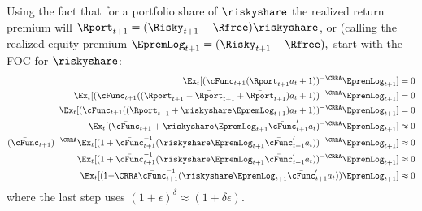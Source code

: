 \documentclass{handout}
\begin{document}
Using the fact that for a portfolio share of $\riskyshare$ the realized return premium will $\Rport_{t+1}=(\Risky_{t+1}-\Rfree)\riskyshare$, or (calling the realized equity premium $\EpremLog_{t+1}=(\Risky_{t+1}-\Rfree),$ start with the FOC for $\riskyshare$:
\begin{equation}\begin{gathered}\begin{aligned}
      \Ex_{t}[(\cFunc_{t+1}(\Rport_{t+1}{a}_{t}+1))^{-\CRRA}\EpremLog_{t+1}] & =  0 \label{eq:gameulernewnew}
      \\ \Ex_{t}[(\cFunc_{t+1}((\Rport_{t+1}-\ERport_{t+1}+\ERport_{t+1}){a}_{t}+1))^{-\CRRA}\EpremLog_{t+1}] & =  0
      \\ \Ex_{t}[(\cFunc_{t+1}((\ERport_{t+1}+\riskyshare\EpremLog_{t+1}){a}_{t}+1))^{-\CRRA}\EpremLog_{t+1}] & =  0
      \\ \Ex_{t}[(\cNxt+\riskyshare\EpremLog_{t+1}\bar{\cFunc}^{\prime}_{t+1}{a}_{t}\orderTwo )^{-\CRRA}\EpremLog_{t+1}] & \approx  0
      \\ (\cNxt)^{-\CRRA}
      \Ex_{t}[
      (1+
      \cNxt^{-1}(\riskyshare\EpremLog_{t+1}\bar{\cFunc}^{\prime}_{t+1}{a}_{t}\orderTwo)
      )^{-\CRRA}\EpremLog_{t+1}
      ]
      & \approx  0
      \\ \Ex_{t}[(1+\cNxt^{-1}(\riskyshare\EpremLog_{t+1}\bar{\cFunc}^{\prime}_{t+1}{a}_{t}\orderTwo))^{-\CRRA}\EpremLog_{t+1}]& \approx  0
      \\ 
      \Ex_{t}[
      (1{-\CRRA}
      \cNxt^{-1}(\riskyshare\EpremLog_{t+1}\bar{\cFunc}^{\prime}_{t+1}{a}_{t}\orderTwo)
      )\EpremLog_{t+1}
      ]
      & \approx  0
    \end{aligned}\end{gathered}\end{equation}
where the last step uses $(1+\epsilon)^{\delta} \approx (1+\delta \epsilon)$.
\end{document}
